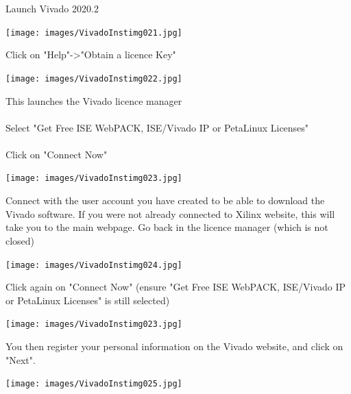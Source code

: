 \begin{minipage}{\linewidth}
  Launch Vivado 2020.2
  \\
  \begin{center}
    \texttt{[image: images/VivadoInstimg021.jpg]}
  \end{center}
\end{minipage}

\begin{minipage}{\linewidth}
  Click on "Help"->"Obtain a licence Key"
  \\
  \begin{center}
    \texttt{[image: images/VivadoInstimg022.jpg]}
  \end{center}
\end{minipage}

\begin{minipage}{\linewidth}
This launches the Vivado licence manager \\
  \\
  Select "Get Free ISE WebPACK, ISE/Vivado IP or PetaLinux Licenses" \\
  \\
  Click on "Connect Now"
  \\
  \begin{center}
    \texttt{[image: images/VivadoInstimg023.jpg]}
  \end{center}
\end{minipage}

\begin{minipage}{\linewidth}
  Connect with the user account you have created to be able to download the Vivado software.
  If you were not already connected to Xilinx website, this will take you to the main webpage.
  Go back in the licence manager (which is not closed)
  \\
  \begin{center}
    \texttt{[image: images/VivadoInstimg024.jpg]}
  \end{center}
\end{minipage}

\begin{minipage}{\linewidth}
  Click again on "Connect Now" (ensure "Get Free ISE WebPACK, ISE/Vivado IP or PetaLinux Licenses" is still selected)
  \\
  \begin{center}
    \texttt{[image: images/VivadoInstimg023.jpg]}
  \end{center}
\end{minipage}

\begin{minipage}{\linewidth}
  You then register your personal information on the Vivado website, and click on "Next".
  \\
  \begin{center}
    \texttt{[image: images/VivadoInstimg025.jpg]}
  \end{center}
\end{minipage}


